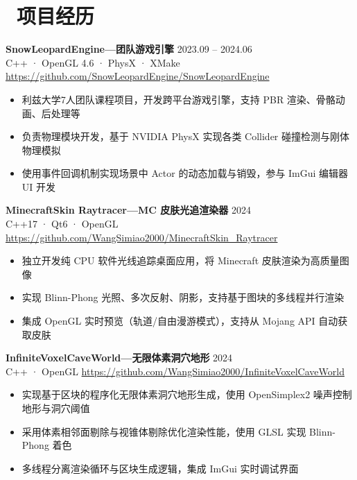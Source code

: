 \documentclass[10pt,a4paper]{article}
\newcommand{\smallurl}[1]{\href{#1}{{\small #1}}}
\begin{document}
\section{\faCode\ 项目经历}

\textbf{SnowLeopardEngine\hspace{0.3em}—\hspace{0.3em}团队游戏引擎} \hfill 2023.09 -- 2024.06 \\
C++ · OpenGL 4.6 · PhysX · XMake \hfill \smallurl{https://github.com/SnowLeopardEngine/SnowLeopardEngine}
\begin{itemize}
  \item 利兹大学7人团队课程项目，开发跨平台游戏引擎，支持 PBR 渲染、骨骼动画、后处理等
  \item 负责物理模块开发，基于 NVIDIA PhysX 实现各类 Collider 碰撞检测与刚体物理模拟
  \item 使用事件回调机制实现场景中 Actor 的动态加载与销毁，参与 ImGui 编辑器 UI 开发
\end{itemize}

\vspace{3pt}

\textbf{MinecraftSkin Raytracer\hspace{0.3em}—\hspace{0.3em}MC 皮肤光追渲染器} \hfill 2024 \\
C++17 · Qt6 · OpenGL \hfill \smallurl{https://github.com/WangSimiao2000/MinecraftSkin\_Raytracer}
\begin{itemize}
  \item 独立开发纯 CPU 软件光线追踪桌面应用，将 Minecraft 皮肤渲染为高质量图像
  \item 实现 Blinn-Phong 光照、多次反射、阴影，支持基于图块的多线程并行渲染
  \item 集成 OpenGL 实时预览（轨道/自由漫游模式），支持从 Mojang API 自动获取皮肤
\end{itemize}

\vspace{3pt}

\textbf{InfiniteVoxelCaveWorld\hspace{0.3em}—\hspace{0.3em}无限体素洞穴地形} \hfill 2024 \\
C++ · OpenGL \hfill \smallurl{https://github.com/WangSimiao2000/InfiniteVoxelCaveWorld}
\begin{itemize}
  \item 实现基于区块的程序化无限体素洞穴地形生成，使用 OpenSimplex2 噪声控制地形与洞穴阈值
  \item 采用体素相邻面剔除与视锥体剔除优化渲染性能，使用 GLSL 实现 Blinn-Phong 着色
  \item 多线程分离渲染循环与区块生成逻辑，集成 ImGui 实时调试界面
\end{itemize}
\end{document}
